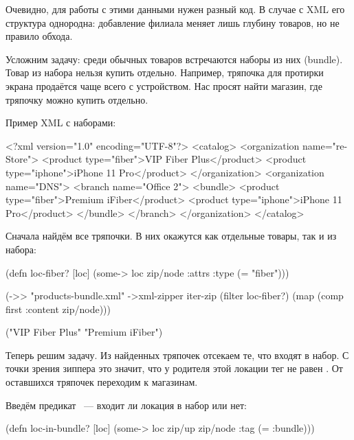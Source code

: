 Очевидно, для работы с этими данными нужен разный код. В случае с XML его
структура однородна: добавление филиала меняет лишь глубину товаров, но не
правило обхода.

Усложним задачу: среди обычных товаров встречаются наборы из них (bundle). Товар
из набора нельзя купить отдельно. Например, тряпочка для протирки экрана
продаётся чаще всего с устройством. Нас просят найти магазин, где тряпочку можно
купить отдельно.

Пример XML с наборами:

\begin{english}
  \begin{xml}
<?xml version="1.0" encoding="UTF-8"?>
<catalog>
  <organization name="re-Store">
    <product type="fiber">VIP Fiber Plus</product>
    <product type="iphone">iPhone 11 Pro</product>
  </organization>
  <organization name="DNS">
    <branch name="Office 2">
      <bundle>
        <product type="fiber">Premium iFiber</product>
        <product type="iphone">iPhone 11 Pro</product>
      </bundle>
    </branch>
  </organization>
</catalog>
  \end{xml}
\end{english}

Сначала найдём все тряпочки. В них окажутся как отдельные товары, так и из
набора:

\begin{english}
  \begin{clojure}
(defn loc-fiber? [loc]
  (some-> loc zip/node :attrs :type (= "fiber")))

(->> "products-bundle.xml"
     ->xml-zipper
     iter-zip
     (filter loc-fiber?)
     (map (comp first :content zip/node)))

("VIP Fiber Plus" "Premium iFiber")
  \end{clojure}
\end{english}

Теперь решим задачу. Из найденных тряпочек отсекаем те, что входят в набор. С
точки зрения зиппера это значит, что у родителя этой локации тег не равен
. От оставшихся тряпочек переходим к магазинам.

Введём предикат ~--- входит ли локация в набор или нет:

\begin{english}
  \begin{clojure}
(defn loc-in-bundle? [loc]
  (some-> loc zip/up zip/node :tag (= :bundle)))
  \end{clojure}
\end{english}

